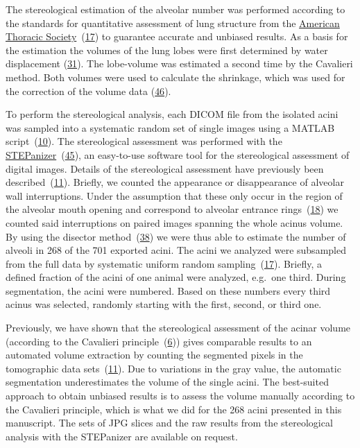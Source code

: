 \documentclass[
  american,
]{article}
\begin{document}
The stereological estimation of the alveolar number was performed according to the standards for quantitative assessment of lung structure from the \href{http://www.thoracic.org/}{American Thoracic Society}~(\protect\hyperlink{ref-dNc8FfNn}{17}) to guarantee accurate and unbiased results.
As a basis for the estimation the volumes of the lung lobes were first determined by water displacement (\protect\hyperlink{ref-KGbSQovR}{31}).
The lobe-volume was estimated a second time by the Cavalieri method.
Both volumes were used to calculate the shrinkage, which was used for the correction of the volume data (\protect\hyperlink{ref-wnl86DEM}{46}).

To perform the stereological analysis, each DICOM file from the isolated acini was sampled into a systematic random set of single images using a MATLAB script~(\protect\hyperlink{ref-12Z2YPzm8}{10}).
The stereological assessment was performed with the \href{http://stepanizer.com/}{STEPanizer}~(\protect\hyperlink{ref-nPoQ2EIB}{45}), an easy-to-use software tool for the stereological assessment of digital images.
Details of the stereological assessment have previously been described~(\protect\hyperlink{ref-7YLeeyu}{11}).
Briefly, we counted the appearance or disappearance of alveolar wall interruptions.
Under the assumption that these only occur in the region of the alveolar mouth opening and correspond to alveolar entrance rings~(\protect\hyperlink{ref-QiAxY2i3}{18}) we counted said interruptions on paired images spanning the whole acinus volume.
By using the disector method~(\protect\hyperlink{ref-FJ9FoB4m}{38}) we were thus able to estimate the number of alveoli in 268 of the 701 exported acini.
The acini we analyzed were subsampled from the full data by systematic uniform random sampling~(\protect\hyperlink{ref-dNc8FfNn}{17}).
Briefly, a defined fraction of the acini of one animal were analyzed, e.g.~one third.
During segmentation, the acini were numbered.
Based on these numbers every third acinus was selected, randomly starting with the first, second, or third one.

Previously, we have shown that the stereological assessment of the acinar volume (according to the Cavalieri principle~(\protect\hyperlink{ref-FE9HLB4f}{6})) gives comparable results to an automated volume extraction by counting the segmented pixels in the tomographic data sets~(\protect\hyperlink{ref-7YLeeyu}{11}).
Due to variations in the gray value, the automatic segmentation underestimates the volume of the single acini.
The best-suited approach to obtain unbiased results is to assess the volume manually according to the Cavalieri principle, which is what we did for the 268 acini presented in this manuscript.
The sets of JPG slices and the raw results from the stereological analysis with the STEPanizer are available on request.
\end{document}
